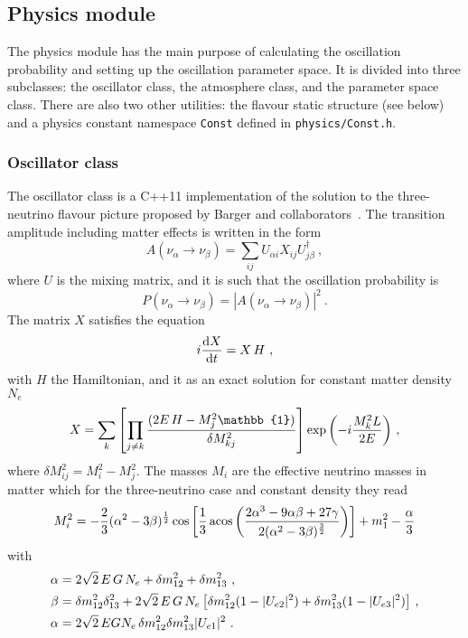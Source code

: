 \documentclass[a4paper, 11pt]{article}
\begin{document}
\subsection{Physics module}
\label{sec:physics}

The physics module has the main purpose of calculating the oscillation probability and setting up the oscillation parameter space.
It is divided into three subclasses: the oscillator class, the atmosphere class, and the parameter space class.
There are also two other utilities: the flavour static structure (see below) %
and a physics constant namespace \texttt{Const} defined in \texttt{physics/Const.h}.

\subsubsection{Oscillator class}
\label{sec:oscillator}

The oscillator class is a C++11 implementation of the solution to the three-neutrino flavour picture proposed by Barger and collaborators~\cite{Barger:1980tf}.
The transition amplitude including matter effects is written in the form
\begin{equation}
	A(\nu_\alpha \to \nu_\beta) = \sum_{ij} U_{\alpha i} X_{ij} U_{j \beta}^\dagger\ ,
\end{equation}
where $U$ is the mixing matrix, and it is such that the oscillation probability is
\begin{equation}
	P(\nu_\alpha \to \nu_\beta) = |A(\nu_\alpha \to \nu_\beta)|^2  \ .
\end{equation}
The matrix $X$ satisfies the equation
\begin{equation}
	i \dv{X}{t} = X\,H\ ,
\end{equation}
with $H$ the Hamiltonian, and it as an exact solution for constant matter density $N_e$
\begin{equation}
	X = \sum_k \qty[\prod_{j\neq k} \frac{(2E\,H - M^2_j \mathbb{1})}{\delta M_{kj}^2}] \exp\qty(-i \frac{M_k^2 L}{2E})\ ,
\end{equation}
where $\delta M^2_{ij} = M^2_i - M^2_j$.
The masses $M_i$ are the effective neutrino masses in matter which for the three-neutrino case and constant density %
they read
\begin{equation}
	M^2_i = -\frac{2}{3}(\alpha^2 - 3\beta)^\frac{1}{2} \cos \qty[\frac{1}{3} \acos %
			\qty(\frac{2\alpha^3 - 9\alpha \beta + 27\gamma}{2(\alpha^2 - 3\beta)^{\frac{3}{2}}})] %
			+ m_1^2 - \frac{\alpha}{3}
\end{equation}
with
\begin{align}
	\alpha &= 2\sqrt{2}\,E\,G\,N_e + \delta m^2_{12} + \delta m^2_{13}\ , \\
	\beta  &= \delta m^2_{12} \delta^2_{13} + 2\sqrt{2}\,E\,G\,N_e \,\qty[\delta m^2_{12} (1-|U_{e2}|^2) + \delta m^2_{13}(1-|U_{e3}|^2)]\ , \\
	\alpha &= 2\sqrt{2}\,EGN_e \,\delta m^2_{12} \delta m^2_{13} |U_{e1}|^2\ .
\end{align}
\end{document}
